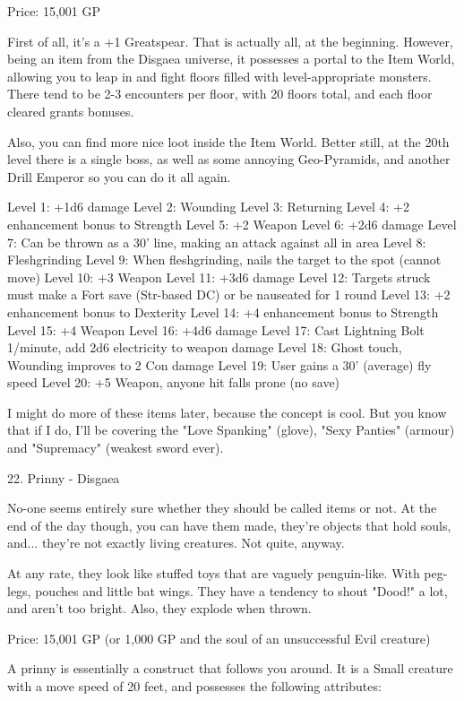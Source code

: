 \begin{multicols}{2}
Price: 15,001 GP

First of all, it's a +1 Greatspear. That is actually all, at the beginning. However, being an item from the Disgaea universe, it possesses a portal to the Item World, allowing you to leap in and fight floors filled with level-appropriate monsters. There tend to be 2-3 encounters per floor, with 20 floors total, and each floor cleared grants bonuses.

Also, you can find more nice loot inside the Item World. Better still, at the 20th level there is a single boss, as well as some annoying Geo-Pyramids, and another Drill Emperor so you can do it all again.

Level 1: +1d6 damage
Level 2: Wounding
Level 3: Returning
Level 4: +2 enhancement bonus to Strength
Level 5: +2 Weapon
Level 6: +2d6 damage
Level 7: Can be thrown as a 30' line, making an attack against all in area
Level 8: Fleshgrinding
Level 9: When fleshgrinding, nails the target to the spot (cannot move)
Level 10: +3 Weapon
Level 11: +3d6 damage
Level 12: Targets struck must make a Fort save (Str-based DC) or be nauseated for 1 round
Level 13: +2 enhancement bonus to Dexterity
Level 14: +4 enhancement bonus to Strength
Level 15: +4 Weapon
Level 16: +4d6 damage
Level 17: Cast Lightning Bolt 1/minute, add 2d6 electricity to weapon damage
Level 18: Ghost touch, Wounding improves to 2 Con damage
Level 19: User gains a 30' (average) fly speed
Level 20: +5 Weapon, anyone hit falls prone (no save)

I might do more of these items later, because the concept is cool. But you know that if I do, I'll be covering the "Love Spanking" (glove), "Sexy Panties" (armour) and "Supremacy" (weakest sword ever). 


22. Prinny - Disgaea

No-one seems entirely sure whether they should be called items or not. At the end of the day though, you can have them made, they're objects that hold souls, and... they're not exactly living creatures. Not quite, anyway.

At any rate, they look like stuffed toys that are vaguely penguin-like. With peg-legs, pouches and little bat wings. They have a tendency to shout "Dood!" a lot, and aren't too bright. Also, they explode when thrown.

Price: 15,001 GP (or 1,000 GP and the soul of an unsuccessful Evil creature)

A prinny is essentially a construct that follows you around. It is a Small creature with a move speed of 20 feet, and possesses the following attributes:


\end{multicols}
